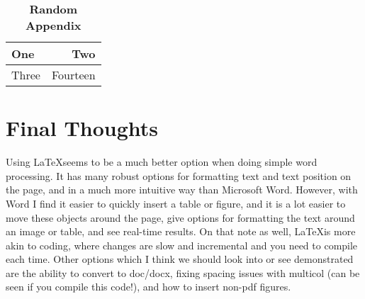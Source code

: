 \documentclass[11pt]{article}
\begin{document}
\begin{table}[h]
  \centering
  \caption{\textbf{Random Appendix}}
  \label{tab:fe}
  \vspace{6pt}
  \renewcommand{\arraystretch}{1.2}
  \begin{tabular}{|l|r|}
    \hline
    One & Two \\
    \hline
    Three & Fourteen \\
    \hline
  \end{tabular}
\end{table}

\section{Final Thoughts}

Using \LaTeX seems to be a much better option when doing simple word processing. It has many robust options for formatting text and text position on the page, and in a much more intuitive way than Microsoft Word. However, with Word I find it easier to quickly insert a table or figure, and it is a lot easier to move these objects around the page, give options for formatting the text around an image or table, and see real-time results. On that note as well, \LaTeX is more akin to coding, where changes are slow and incremental and you need to compile each time. Other options which I think we should look into or see demonstrated are the ability to convert to doc/docx, fixing spacing issues with multicol (can be seen if you compile this code!), and how to insert non-pdf figures.
\end{document}
